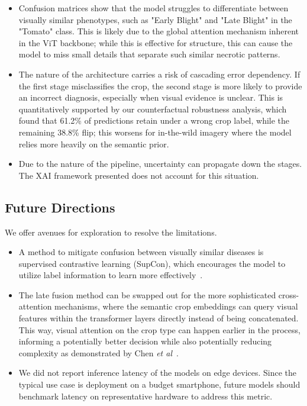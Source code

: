 \documentclass{bmvc2k}
\def\etal{\emph{et al}\bmvaOneDot}
\begin{document}
\begin{itemize}
    \item Confusion matrices show that the model struggles to differentiate between visually similar phenotypes, such as "Early Blight" and "Late Blight" in the "Tomato" class. This is likely due to the global attention mechanism inherent in the ViT backbone; while this is effective for structure, this can cause the model to miss small details that separate such similar necrotic patterns.
    \item The nature of the architecture carries a risk of cascading error dependency. If the first stage misclassifies the crop, the second stage is more likely to provide an incorrect diagnosis, especially when visual evidence is unclear. This is quantitatively supported by our counterfactual robustness analysis, which found that 61.2\% of predictions retain under a wrong crop label, while the remaining 38.8\% flip; this worsens for in-the-wild imagery where the model relies more heavily on the semantic prior.
    \item Due to the nature of the pipeline, uncertainty can propagate down the stages. The XAI framework presented does not account for this situation.
\end{itemize}

\subsection{Future Directions}

We offer avenues for exploration to resolve the limitations.
\begin{itemize}
\item A method to mitigate confusion between visually similar diseases is supervised contrastive learning (SupCon), which encourages the model to utilize label information to learn more effectively~\cite{khosla2020supervised}.
\item The late fusion method can be swapped out for the more sophisticated cross-attention mechanisms, where the semantic crop embeddings can query visual features within the transformer layers directly instead of being concatenated. This way, visual attention on the crop type can happen earlier in the process, informing a potentially better decision while also potentially reducing complexity as demonstrated by Chen \etal~\cite{Chen_2021_ICCV}.
\item We did not report inference latency of the models on edge devices. Since the typical use case is deployment on a budget smartphone, future models should benchmark latency on representative hardware to address this metric.
\end{itemize}


\end{document}
